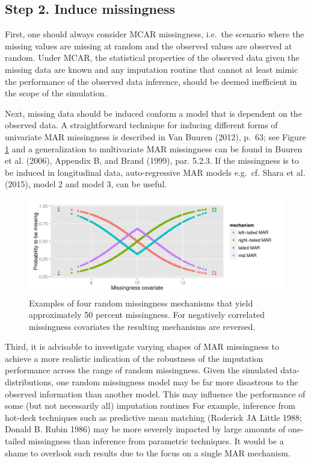 \documentclass[
]{article}
\begin{document}
\hypertarget{step-2.-induce-missingness}{%
\subsection{Step 2. Induce
missingness}\label{step-2.-induce-missingness}}

First, one should always consider MCAR missingness, i.e.~the scenario
where the missing values are missing at random and the observed values
are observed at random. Under MCAR, the statistical properties of the
observed data given the missing data are known and any imputation
routine that cannot at least mimic the performance of the observed data
inference, should be deemed inefficient in the scope of the simulation.

Next, missing data should be induced conform a model that is dependent
on the observed data. A straightforward technique for inducing different
forms of univariate MAR missingness is described in Van Buuren (2012),
p.~63; see Figure \ref{fig:MAR} and a generalization to multivariate MAR
missingness can be found in Buuren et al. (2006), Appendix B, and Brand
(1999), par. 5.2.3. If the missingness is to be induced in longitudinal
data, auto-regressive MAR models e.g.~cf. Shara et al. (2015), model 2
and model 3, can be useful.

\begin{figure}
\centering
\includegraphics{img/plot_mar.pdf}
\caption{\label{fig:MAR}Examples of four random missingness mechanisms
that yield approximately 50 percent missingness. For negatively
correlated missingness covariates the resulting mechanisms are
reversed.}
\end{figure}

Third, it is advisable to investigate varying shapes of MAR missingness
to achieve a more realistic indication of the robustness of the
imputation performance across the range of random missingness. Given the
simulated data-distributions, one random missingness model may be far
more disastrous to the observed information than another model. This may
influence the performance of some (but not necessarily all) imputation
routines For example, inference from hot-deck techniques such as
predictive mean matching (Roderick JA Little 1988; Donald B. Rubin 1986)
may be more severely impacted by large amounts of one-tailed missingness
than inference from parametric techniques. It would be a shame to
overlook such results due to the focus on a single MAR mechanism.
\end{document}
